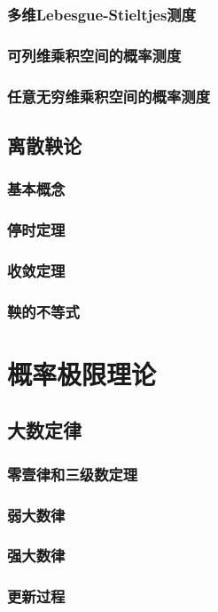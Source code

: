 \section{多维Lebesgue-Stieltjes测度}
\section{可列维乘积空间的概率测度}
\section{任意无穷维乘积空间的概率测度}
\chapter{离散鞅论}
\section{基本概念}
\section{停时定理}
\section{收敛定理}
\section{鞅的不等式}

\part{概率极限理论}


	
\chapter{大数定律}
	\section{零壹律和三级数定理}
	\section{弱大数律}
	\section{强大数律}
	\section{更新过程}
